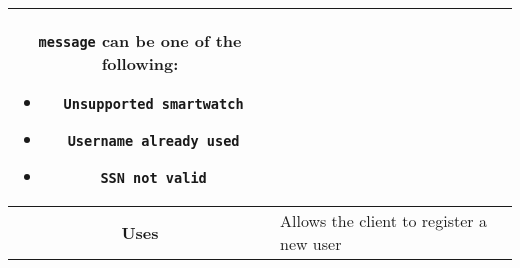 \begin{adjustwidth}{1cm}{}
\begin{tabular}{|c|l|}
\begin{minipage}[t]{0.7\textwidth}
\begin{adjustwidth}{1.5cm}{}
                \end{adjustwidth}
                \texttt{message} can be one of the following: 
                \begin{itemize}
                    \item \texttt{Unsupported smartwatch}
                    \item \texttt{Username already used}
                    \item \texttt{SSN not valid}
                \end{itemize}
              \end{minipage} \\
              \hline
            \textbf{Uses} & Allows the client to register a new user \\
            \hline
        \end{tabular}
    \end{adjustwidth}

